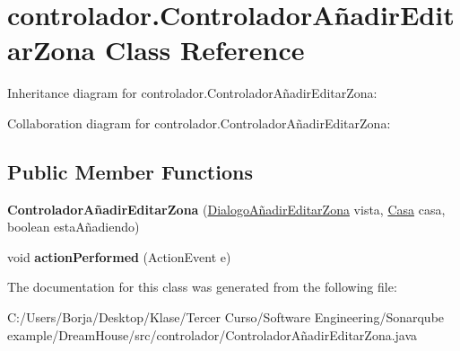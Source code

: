 \hypertarget{classcontrolador_1_1_controlador_a_xC3_xB1adir_editar_zona}{}\section{controlador.\+Controlador\+Añadir\+Editar\+Zona Class Reference}
\label{classcontrolador_1_1_controlador_a_xC3_xB1adir_editar_zona}


Inheritance diagram for controlador.\+Controlador\+Añadir\+Editar\+Zona\+:


Collaboration diagram for controlador.\+Controlador\+Añadir\+Editar\+Zona\+:
\subsection*{Public Member Functions}
\begin{DoxyCompactItemize}
\item 
\mbox{\label{classcontrolador_1_1_controlador_a_xC3_xB1adir_editar_zona_a2a27c449b5c5bdd3a6f1cf05d600bd97}} 
{\bfseries Controlador\+Añadir\+Editar\+Zona} (\mbox{\hyperlink{classvista_1_1_dialogo_a_xC3_xB1adir_editar_zona}{Dialogo\+Añadir\+Editar\+Zona}} vista, \mbox{\hyperlink{classmodelo_1_1_casa}{Casa}} casa, boolean esta\+Añadiendo)
\item 
\mbox{\label{classcontrolador_1_1_controlador_a_xC3_xB1adir_editar_zona_adc1d0f47740fb96ef70428061228efd1}} 
void {\bfseries action\+Performed} (Action\+Event e)
\end{DoxyCompactItemize}


The documentation for this class was generated from the following file\+:\begin{DoxyCompactItemize}
\item 
C\+:/\+Users/\+Borja/\+Desktop/\+Klase/\+Tercer Curso/\+Software Engineering/\+Sonarqube example/\+Dream\+House/src/controlador/Controlador\+Añadir\+Editar\+Zona.\+java\end{DoxyCompactItemize}
